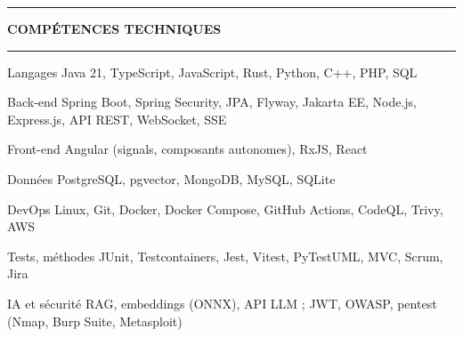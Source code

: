 \documentclass[10pt,a4paper]{article}
\newlength{\gut}\setlength{\gut}{2.55cm}
\newcommand{\cvsection}[1]{%
  \vspace{4pt}%
  {\color{ink}\rule[-0.5pt]{2.4pt}{9pt}}\hspace{6pt}%
  {\small\bfseries\MakeUppercase{#1}}\hspace{8pt}%
  {\color{hair}\leaders\hrule height 3.4pt depth -2.9pt\hfill}\par
  \vspace{2pt}}
\newenvironment{grid}{%
  \begin{list}{}{\setlength{\leftmargin}{\gut}\setlength{\labelwidth}{\gut-8pt}%
    \setlength{\labelsep}{8pt}\setlength{\itemsep}{2.5pt}\setlength{\topsep}{0pt}%
    \setlength{\parsep}{0pt}\setlength{\partopsep}{0pt}%
    \renewcommand{\makelabel}[1]{\makebox[\labelwidth][l]{\small\color{soft}##1}}}}
  {\end{list}}
\newcommand{\sep}{\hspace{0.5em}{\color{hair}|}\hspace{0.5em}}
\begin{document}
\cvsection{Compétences techniques}
\begin{grid}\setlength{\itemsep}{1.5pt}
  \item[Langages]      {\small Java 21, TypeScript, JavaScript, Rust, Python, C++, PHP, SQL}
  \item[Back-end]      {\small Spring Boot, Spring Security, JPA, Flyway, Jakarta EE, Node.js, Express.js, API REST, WebSocket, SSE}
  \item[Front-end]     {\small Angular (signals, composants autonomes), RxJS, React}
  \item[Données]       {\small PostgreSQL, pgvector, MongoDB, MySQL, SQLite}
  \item[DevOps]        {\small Linux, Git, Docker, Docker Compose, GitHub Actions, CodeQL, Trivy, AWS}
  \item[Tests, méthodes]{\small JUnit, Testcontainers, Jest, Vitest, PyTest\sep UML, MVC, Scrum, Jira}
  \item[IA et sécurité]{\small RAG, embeddings (ONNX), API LLM ; JWT, OWASP, pentest (Nmap, Burp Suite, Metasploit)}
\end{grid}
\end{document}

